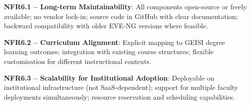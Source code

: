 \textbf{NFR6.1 -- Long-term Maintainability}: All components open-source or freely available; no vendor lock-in; source code in GitHub with clear documentation; backward compatibility with older EVE-NG versions where feasible.

\textbf{NFR6.2 -- Curriculum Alignment}: Explicit mapping to GEISI degree learning outcomes; integration with existing course structures; flexible customisation for different instructional contexts.

\textbf{NFR6.3 -- Scalability for Institutional Adoption}: Deployable on institutional infrastructure (not SaaS-dependent); support for multiple faculty deployments simultaneously; resource reservation and scheduling capabilities.
